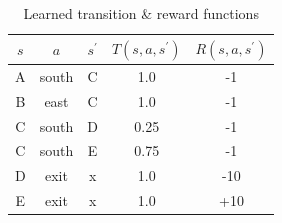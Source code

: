\documentclass{homework}
\begin{document}

\begin{table}[h!]
    \centering
    \begin{tabular}{c|c|c|c|c}
        \toprule
        $s$ & $a$ & $s^{\prime}$ & $T(s, a, s^{\prime})$ & $R(s, a, s^{\prime})$ \\
        \midrule
        A & south & C & 1.0 & -1 \\
        B & east & C & 1.0 & -1 \\
        C & south & D & 0.25 & -1 \\
        C & south & E & 0.75 & -1 \\
        D & exit & x & 1.0 & -10 \\
        E & exit & x & 1.0 & +10 \\
        \bottomrule
    \end{tabular}
    \caption{Learned transition \& reward functions}
    \label{tab:q3model}
\end{table}
\end{document}
